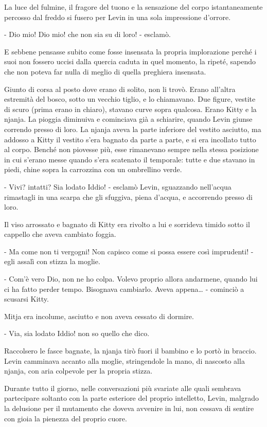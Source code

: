 La luce del fulmine, il fragore del tuono e la sensazione del corpo istantaneamente percosso dal freddo si fusero per Levin in una sola impressione d'orrore. 

- Dio mio! Dio mio! che non sia su di loro! - esclamò. 

E sebbene pensasse subito come fosse insensata la propria implorazione perché i suoi non fossero uccisi dalla quercia caduta in quel momento, la ripeté, sapendo che non poteva far nulla di meglio di quella preghiera insensata. 

Giunto di corsa al posto dove erano di solito, non li trovò. Erano all'altra estremità del bosco, sotto un vecchio tiglio, e lo chiamavano. Due figure, vestite di scuro (prima erano in chiaro), stavano curve sopra qualcosa. Erano Kitty e la njanja. La pioggia diminuiva e cominciava già a schiarire, quando Levin giunse correndo presso di loro. La njanja aveva la parte inferiore del vestito asciutto, ma addosso a Kitty il vestito s'era bagnato da parte a parte, e si era incollato tutto al corpo. Benché non piovesse più, esse rimanevano sempre nella stessa posizione in cui s'erano messe quando s'era scatenato il temporale: tutte e due stavano in piedi, chine sopra la carrozzina con un ombrellino verde. 

- Vivi? intatti? Sia lodato Iddio! - esclamò Levin, sguazzando nell'acqua rimastagli in una scarpa che gli sfuggiva, piena d'acqua, e accorrendo presso di loro. 

Il viso arrossato e bagnato di Kitty era rivolto a lui e sorrideva timido sotto il cappello che aveva cambiato foggia. 

- Ma come non ti vergogni! Non capisco come si possa essere così imprudenti! - egli assalì con stizza la moglie. 

- Com'è vero Dio, non ne ho colpa. Volevo proprio allora andarmene, quando lui ci ha fatto perder tempo. Bisognava cambiarlo. Aveva appena\ldots{} - cominciò a scusarsi Kitty. 

Mitja era incolume, asciutto e non aveva cessato di dormire. 

- Via, sia lodato Iddio! non so quello che dico. 

Raccolsero le fasce bagnate, la njanja tirò fuori il bambino e lo portò in braccio. Levin camminava accanto alla moglie, stringendole la mano, di nascosto alla njanja, con aria colpevole per la propria stizza. 

Durante tutto il giorno, nelle conversazioni più svariate alle quali sembrava partecipare soltanto con la parte esteriore del proprio intelletto, Levin, malgrado la delusione per il mutamento che doveva avvenire in lui, non cessava di sentire con gioia la pienezza del proprio cuore. 

